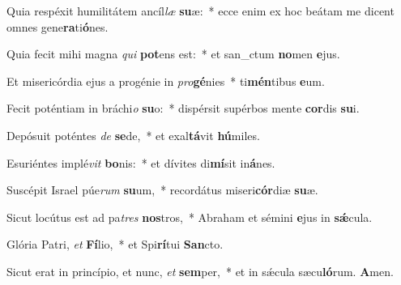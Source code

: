 \item Quia respéxit humilitátem ancíl\textit{læ} \textbf{su}æ:~* ecce enim ex hoc beátam me dicent omnes gene\textbf{ra}ti\textbf{ó}nes.
\item Quia fecit mihi magna \textit{qui} \textbf{pot}ens est:~* et san\_ctum \textbf{no}men \textbf{e}jus.
\item Et misericórdia ejus a progénie in \textit{pro}\textbf{gé}nies~* ti\textbf{mén}tibus \textbf{e}um.
\item Fecit poténtiam in bráchi\textit{o} \textbf{su}o:~* dispérsit supérbos mente \textbf{cor}dis \textbf{su}i.
\item Depósuit poténtes \textit{de} \textbf{se}de,~* et exal\textbf{tá}vit \textbf{hú}miles.
\item Esuriéntes implé\textit{vit} \textbf{bo}nis:~* et dívites di\textbf{mí}sit in\textbf{á}nes.
\item Suscépit Israel púe\textit{rum} \textbf{su}um,~* recordátus miseri\textbf{cór}diæ \textbf{su}æ.
\item Sicut locútus est ad pa\textit{tres} \textbf{nos}tros,~* Abraham et sémini \textbf{e}jus in \textbf{sǽ}cula.
\item Glória Patri, \textit{et} \textbf{Fí}lio,~* et Spi\textbf{rí}tui \textbf{San}cto.
\item Sicut erat in princípio, et nunc, \textit{et} \textbf{sem}per,~* et in sǽcula sæcu\tinyhspace\textbf{ló}rum. \textbf{A}men.
